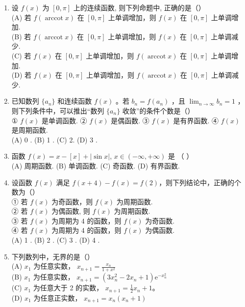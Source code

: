 \documentclass[12pt, a4paper]{ctexart}
\begin{document}
\begin{enumerate}
    \item 设 $ f(x) $ 为 $ [0,\pi] $ 上的连续函数, 则下列命题中, 正确的是（）\\
    (A) 若 $ f(\operatorname{arccot} x) $ 在 $ [0, \pi] $ 上单调增加，则 $ f(x) $ 在 $ [0, \pi] $ 上单调增加.\\
    (B) 若 $ f(\operatorname{arccot} x) $ 在 $ [0, \pi] $ 上单调增加，则 $ f(x) $ 在 $ [0, \pi] $ 上单调减少.\\
    (C) 若 $ f(x) $ 在 $ [0, \pi] $ 上单调增加，则 $ f(\operatorname{arccot} x) $ 在 $ [0, \pi] $ 上单调增加.\\
    (D) 若 $ f(x) $ 在 $ [0, \pi] $ 上单调增加，则 $ f(\operatorname{arccot} x) $ 在 $ [0, \pi] $ 上单调减少.

    \item 已知数列 $ \{a_{n}\} $ 和连续函数 $ f(x) $ 。若 $ b_{n}=f(a_{n}) $ ，且 $ \lim_{n\to\infty}b_{n}=1 $ ，则下列条件中，可以推出“数列 $ \{a_{n}\} $ 收敛”的条件个数是（）\\
    ① $ f(x) $ 是单调函数. ② $ f(x) $ 是偶函数. ③ $ f(x) $ 是有界函数. ④ $ f(x) $ 是周期函数.\\
    (A) 0 . \quad (B) 1 . \quad (C) 2. \quad (D) 3 .

    \item 函数 $ f(x)=x-[x]+|\sin x| $, $ x\in(-\infty,+\infty) $ 是 （ ）\\
    (A) 周期函数. (B) 单调函数. (C) 奇函数. (D) 有界函数.

    \item 设函数 $ f(x) $ 满足 $ f(x+4) - f(x) = f(2) $，则下列结论中，正确的个数为（）\\
    ① 若 $ f(x) $ 为奇函数，则 $ f(x) $ 为周期函数.\\
    ② 若 $ f(x) $ 为偶函数, 则 $ f(x) $ 为周期函数.\\
    ③ 若 $ f(x) $ 为周期为 4 的函数，则 $ f(x) $ 为奇函数.\\
    ④ 若 $ f(x) $ 为周期为 4 的函数，则 $ f(x) $ 为偶函数.\\
    (A) 1 . \quad (B) 2 . \quad (C) 3 . \quad (D) 4 .

    \item 下列数列中，无界的是（）\\
    (A) $ x_{1} $ 为任意实数， $ x_{n+1}=\frac{x_{n}}{1+x^{2}} $\\
    (B) $ x_{1} $ 为任意实数， $ x_{n+1}=\left(3x_{n}^{2}-2x_{n}+1\right)\mathrm{e}^{-x_{n}^{2}} $\\
    (C) $ x_{1} $ 为任意大于 2 的实数， $ x_{n+1}=\frac{1}{2}x_{n}+1 $。\\
    (D) $ x_{1} $ 为任意正实数， $ x_{n+1}=x_{n}(x_{n}+1) $


\end{enumerate}
\end{document}
